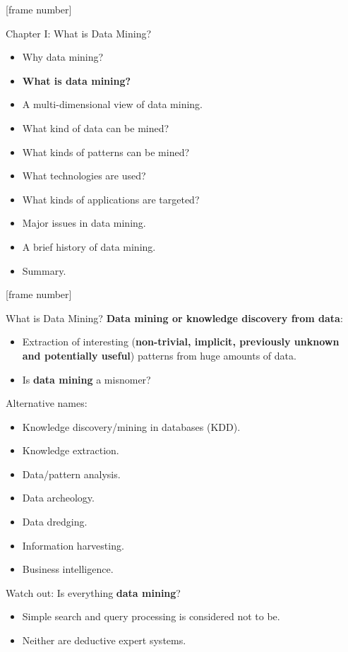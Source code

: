 \documentclass[aspectratio=169,t]{beamer}
\begin{document}
  {
    [frame number]
    \begin{frame}{Chapter I: What is Data Mining?}
        \begin{itemize}
            \item Why data mining?
            \item \textbf{What is data mining?}
            \item A multi-dimensional view of data mining.
            \item What kind of data can be mined?
            \item What kinds of patterns can be mined?
            \item What technologies are used?
            \item What kinds of applications are targeted?
            \item Major issues in data mining.
            \item A brief history of data mining.
            \item Summary.
        \end{itemize}
    \end{frame}
  }

  {
    [frame number]
    \begin{frame}{What is Data Mining?}
    \textbf{Data mining or knowledge discovery from data}:
        \begin{itemize}
            \item Extraction of interesting (\textbf{non-trivial, implicit, previously unknown \\
                  and potentially useful}) patterns from huge amounts of data.
            \item Is \textbf{data mining} a misnomer?
        \end{itemize}
    Alternative names:
        \begin{itemize}
            \item Knowledge discovery/mining in databases (KDD).
            \item Knowledge extraction.
            \item Data/pattern analysis.
            \item Data archeology.
            \item Data dredging.
            \item Information harvesting.
            \item Business intelligence.
        \end{itemize}
    Watch out: Is everything \textbf{data mining}?
        \begin{itemize}
            \item Simple search and query processing is considered not to be.
            \item Neither are deductive expert systems.
        \end{itemize}
    \end{frame}
  }
\end{document}
